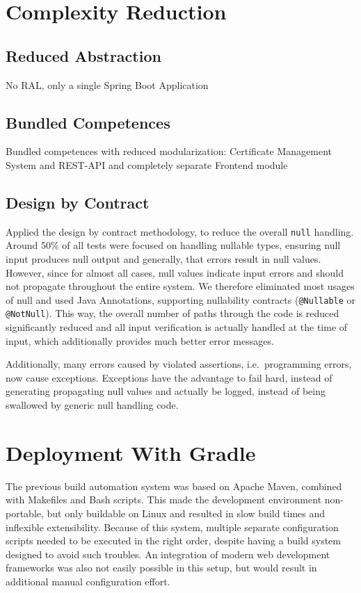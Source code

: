 \section{Complexity Reduction}\label{sec:complexityReduction}
\subsection*{Reduced Abstraction}
No RAL, only a single Spring Boot Application

\subsection*{Bundled Competences}
Bundled competences with reduced modularization: Certificate Management System and REST-API and completely separate Frontend module

\subsection*{Design by Contract}
Applied the design by contract\cite{meyer1992applying} methodology, to reduce the overall \lstinline{null} handling.
Around 50\% of all tests were focused on handling nullable types, ensuring null input produces null output and
generally, that errors result in null values.
However, since for almost all cases, null values indicate input errors and should not propagate throughout the entire
system.
We therefore eliminated most usages of null and used Java Annotations, supporting nullability contracts
(\lstinline{@Nullable} or \lstinline{@NotNull}).
This way, the overall number of paths through the code is reduced significantly reduced and all input verification is
actually handled at the time of input, which additionally provides much better error messages.

Additionally, many errors caused by violated assertions, i.e.\ programming errors, now cause exceptions.
Exceptions have the advantage to fail hard, instead of generating propagating null values and actually be logged,
instead of being swallowed by generic null handling code.

\section{Deployment With Gradle}\label{sec:deploymentWithGradle}
The previous build automation system was based on Apache Maven, combined with Makefiles and Bash scripts.
This made the development environment non-portable, but only buildable on Linux and resulted in slow build times and
inflexible extensibility.
Because of this system, multiple separate configuration scripts needed to be executed in the right order, despite having
a build system designed to avoid such troubles.
An integration of modern web development frameworks was also not easily possible in this setup, but would result in
additional manual configuration effort.

